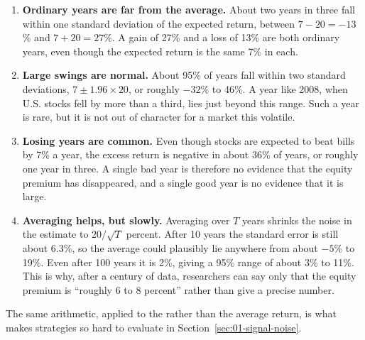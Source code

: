 \begin{enumerate}
  \item \textbf{Ordinary years are far from the average.} About two years in three fall within one standard deviation of the expected return, between $7 - 20 = -13$\% and $7 + 20 = 27$\%. A gain of 27\% and a loss of 13\% are both ordinary years, even though the expected return is the same 7\% in each.
  \item \textbf{Large swings are normal.} About 95\% of years fall within two standard deviations, $7 \pm 1.96 \times 20$, or roughly $-32$\% to 46\%. A year like 2008, when U.S. stocks fell by more than a third, lies just beyond this range. Such a year is rare, but it is not out of character for a market this volatile.
  \item \textbf{Losing years are common.} Even though stocks are expected to beat bills by 7\% a year, 
  the excess return is negative in about 36\% of years, or roughly one year in three. A single bad year is therefore no evidence that the equity premium has disappeared, and a single good year is no evidence that it is large.
  \item \textbf{Averaging helps, but slowly.} Averaging over $T$ years shrinks the noise in the estimate to $20/\sqrt{T}$ percent. After 10 years the standard error is still about 6.3\%, so the average could plausibly lie anywhere from about $-5$\% to 19\%. Even after 100 years it is 2\%, giving a 95\% range of about 3\% to 11\%. This is why, after a century of data, researchers can say only that the equity premium is ``roughly 6 to 8 percent'' rather than give a precise number.
\end{enumerate}

The same arithmetic, applied to the  rather than the average return, is what makes strategies so hard to evaluate in Section~\ref{sec:01-signal-noise}.


